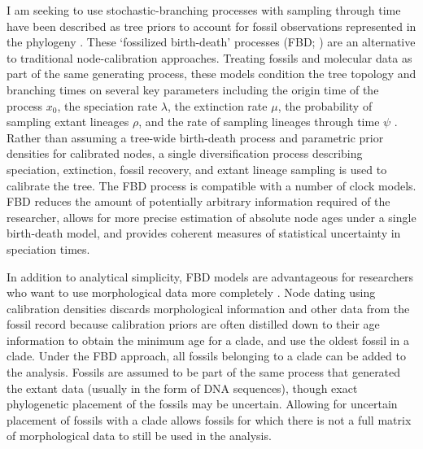 \documentclass[]{article}
\begin{document}
I am seeking to use stochastic-branching processes with sampling through time have been described as tree priors to account for fossil observations represented in the phylogeny \citep{Heath22072014, Stadler2010396,  Didier201226,gavryushkina2014bayesian}. These ‘fossilized birth-death’ processes (FBD; \citep{Heath22072014}) are an alternative to traditional node-calibration approaches. Treating fossils and molecular data as part of the same generating process, these models condition the tree topology and branching times on several key parameters including the origin time of the process $x_0$, the speciation rate $\lambda$, the extinction rate $\mu$, the probability of sampling extant lineages $\rho$, and the rate of sampling lineages through time $\psi$ \citep{Heath22072014, Stadler2010396}. Rather than assuming a tree-wide birth-death process and parametric prior densities for calibrated nodes, a single diversification process describing speciation, extinction, fossil recovery, and extant lineage sampling is used to calibrate the tree. The FBD process is compatible with a number of clock models. FBD reduces the amount of potentially arbitrary information required of the researcher, allows for more precise estimation of absolute node ages under a single birth-death model, and provides coherent measures of statistical uncertainty in speciation times.\par
In addition to analytical simplicity, FBD models are advantageous for researchers who want to use morphological data more completely \citep{gavryushkina2014bayesian}. Node dating using calibration densities discards morphological information and other data from the fossil record because calibration priors are often distilled down to their age information to obtain the minimum age for a clade, and use the oldest fossil in a clade. Under the FBD approach, all fossils belonging to a clade can be added to the analysis. Fossils are assumed to be part of the same process that generated the extant data (usually in the form of DNA sequences), though exact phylogenetic placement of the fossils may be uncertain. Allowing for uncertain placement of fossils with a clade allows fossils for which there is not a full matrix of morphological data to still be used in the analysis. \par    
\end{document}
